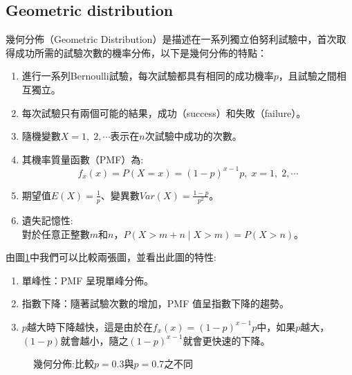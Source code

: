 \documentclass[12pt, a4paper]{article}
\begin{document}
\subsection{Geometric distribution}
幾何分佈（Geometric Distribution）是描述在一系列獨立伯努利試驗中，首次取得成功所需的試驗次數的機率分佈，以下是幾何分佈的特點\;：
\begin{enumerate}
\item 進行一系列Bernoulli試驗，每次試驗都具有相同的成功機率\;$p$\;，且試驗之間相互獨立。
\item 每次試驗只有兩個可能的結果，成功（success）和失敗（failure）。
\item 隨機變數\;$X=1,\;2,\cdots$\;表示在\;$n$\;次試驗中成功的次數。
\item 其機率質量函數（PMF）為\;:
$$f_x(x)=P(X=x)=(1−p)^{x-1}p,\;x=1,\;2,\cdots$$
\item 期望值\;$E(X)=\frac{1}{p}$\;、變異數\;$
Var(X)=\frac{1-p}{p^2}$\;。
\item 遺失記憶性\;:\\
對於任意正整數\;$m$\;和\;$n$\;，\;$P(X>m+n\mid X>m)=P(X>n)$。
\end{enumerate}

由圖\;\ref{fig:parallel3_5}\;中我們可以比較兩張圖，並看出此圖的特性\;:
\begin{enumerate}
\item 單峰性：PMF 呈現單峰分佈。
\item 指數下降：隨著試驗次數的增加，PMF 值呈指數下降的趨勢。
\item $p$\;越大時下降越快，這是由於在\;$f_x(x)=(1−p)^{x-1}p$\;中，如果\;$p$\;越大，\;$(1−p)$\;就會越小，隨之\;$(1−p)^{x-1}$\;就會更快速的下降。
\end{enumerate}

\begin{figure}[H]
\centering
{}
\caption{幾何分佈\;:\;比較$p=0.3$與$p=0.7$之不同}
\label{fig:parallel3_5}
\end{figure}
\end{document}
